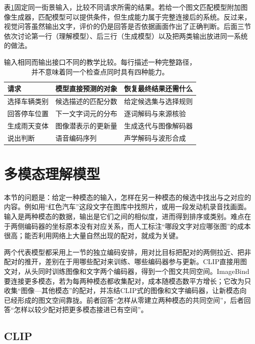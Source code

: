 表\ref{tab:vision-model-interfaces}固定同一街景输入，比较不同请求所需的结果。若给一个图文匹配模型附加图像生成器，匹配模型可以提供条件，但生成能力属于完整连接后的系统。反过来，视觉问答虽然输出文字，评价的仍是回答是否依据画面作出了正确判断。后面三节依次讨论第一行（理解模型）、后三行（生成模型）以及把两类输出放进同一系统的做法。

\begin{table}[htbp]
  \centering
  \small
  \begin{tabularx}{\linewidth}{@{}p{22mm}XX@{}}
    \toprule
    请求 & 模型直接预测的对象 & 恢复最终结果还需什么\\
    \midrule
    选择车辆类别 & 候选描述的匹配分数 & 给定候选集与选择规则\\
    回答停车位置 & 下一文字词元的分布 & 逐词解码与来源核验\\
    生成雨天变体 & 图像潜表示的更新量 & 生成迭代与图像解码器\\
    说出判断 & 语音编码序列 & 声学解码与波形合成\\
    \bottomrule
  \end{tabularx}
  \caption{输入相同而输出接口不同的教学比较。每行描述一种完整路径，并不意味着同一个检查点同时具有四种能力。}
  \label{tab:vision-model-interfaces}
\end{table}
\FloatBarrier

\section{多模态理解模型}
\label{sec:vision-models-understanding}

本节的问题是：给定一种模态的输入，怎样在另一种模态的候选中找出与之对应的内容。例如用“红色汽车”这段文字在图库中找照片，或用一段发动机录音找画面。输入是两种模态的数据，输出是它们之间的相似度，进而得到排序或类别。难点在于两侧编码器的坐标原本没有对应关系，而人工标注“哪段文字对应哪张图”的成本很高；能否利用网络上大量自然出现的配对，就成为关键。

两个代表模型都采用上一节的独立编码安排，用对比目标把配对的两侧拉近、把非配对的推开，差别在于用哪些配对来训练、哪些编码器参与更新。CLIP直接用图文对，从头同时训练图像和文字两个编码器，得到一个图文共同空间。ImageBind要连接更多模态，若为每两种模态都收集配对，成本随模态数平方增长；它改为只收集“图像—其他模态”的配对，并冻结CLIP式的图像和文字编码器，让新模态向已经形成的图文空间靠拢。前者回答“怎样从零建立两种模态的共同空间”，后者回答“怎样以较少配对把更多模态接进已有空间”。

\subsection{CLIP}
\label{sec:vision-models-contrastive}

